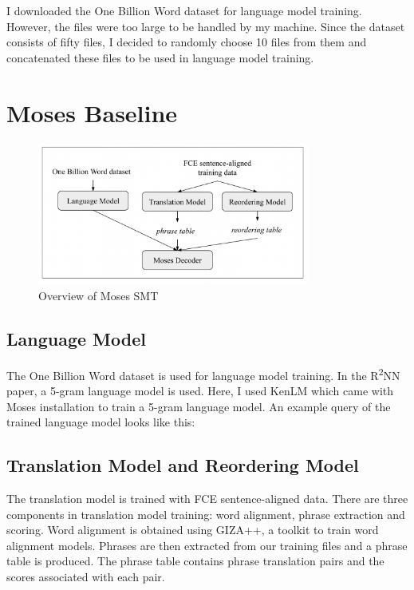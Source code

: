 \documentclass[12pt,a4paper,twoside,openright]{report}
\begin{document}
I downloaded the One Billion Word dataset for language model training. However, the files were too large to be handled by my machine. Since the dataset consists of fifty files, I decided to randomly choose 10 files from them and concatenated these files to be used in language model training. 


\section{Moses Baseline}

\begin{figure}[ht]
\centering
\includegraphics[width=0.8\textwidth]{images/moses_pipeline.png}
\caption{Overview of Moses SMT}
\label{fig:moses_pipeline}
\end{figure}

\subsection{Language Model}
The One Billion Word dataset is used for language model training. In the R\textsuperscript{2}NN paper, a 5-gram language model is used. Here, I used KenLM which came with Moses installation to train a 5-gram language model. An example query of the trained language model looks like this:

\subsection{Translation Model and Reordering Model}
The translation model is trained with FCE sentence-aligned data. There are three components in translation model training: word alignment, phrase extraction and scoring. Word alignment is obtained using GIZA++, a toolkit to train word alignment models. Phrases are then extracted from our training files and a phrase table is produced. The phrase table contains phrase translation pairs and the scores associated with each pair.
\end{document}
